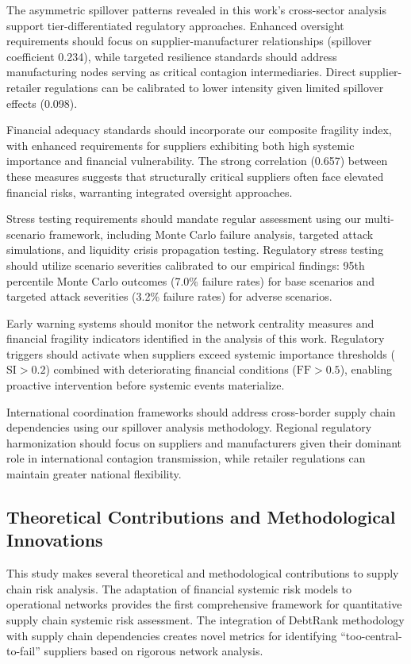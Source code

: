 \documentclass[a4 paper, 11pt,twoside]{article}
\newcommand{\0}{\Bf{0}}
\theoremstyle{definition}
\begin{document}
The asymmetric spillover patterns revealed in this work's cross-sector analysis support tier-differentiated regulatory approaches. Enhanced oversight requirements should focus on supplier-manufacturer relationships (spillover coefficient 0.234), while targeted resilience standards should address manufacturing nodes serving as critical contagion intermediaries. Direct supplier-retailer regulations can be calibrated to lower intensity given limited spillover effects (0.098).

Financial adequacy standards should incorporate our composite fragility index, with enhanced requirements for suppliers exhibiting both high systemic importance and financial vulnerability. The strong correlation (0.657) between these measures suggests that structurally critical suppliers often face elevated financial risks, warranting integrated oversight approaches.

Stress testing requirements should mandate regular assessment using our multi-scenario framework, including Monte Carlo failure analysis, targeted attack simulations, and liquidity crisis propagation testing. Regulatory stress testing should utilize scenario severities calibrated to our empirical findings: 95th percentile Monte Carlo outcomes (7.0\% failure rates) for base scenarios and targeted attack severities (3.2\% failure rates) for adverse scenarios.

Early warning systems should monitor the network centrality measures and financial fragility indicators identified in the analysis of this work. Regulatory triggers should activate when suppliers exceed systemic importance thresholds ($\text{SI} > 0.2$) combined with deteriorating financial conditions ($\text{FF} > 0.5$), enabling proactive intervention before systemic events materialize.

International coordination frameworks should address cross-border supply chain dependencies using our spillover analysis methodology. Regional regulatory harmonization should focus on suppliers and manufacturers given their dominant role in international contagion transmission, while retailer regulations can maintain greater national flexibility.

\subsection{Theoretical Contributions and Methodological Innovations}

This study makes several theoretical and methodological contributions to supply chain risk analysis. The adaptation of financial systemic risk models to operational networks provides the first comprehensive framework for quantitative supply chain systemic risk assessment. The integration of DebtRank methodology with supply chain dependencies creates novel metrics for identifying ``too-central-to-fail'' suppliers based on rigorous network analysis.
\end{document}
